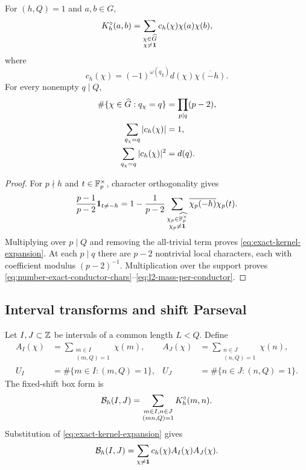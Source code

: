 \begin{proposition}\label{prop:exact-kernel-expansion}
For $(h,Q)=1$ and $a,b\in G$,
\begin{equation}\label{eq:exact-kernel-expansion}
 K_h^\circ(a,b)
 =\sum_{\substack{\chi\in\widehat G\\\chi\ne\mathbf 1}}
 c_h(\chi)\chi(a)\chi(b),
\end{equation}
where
\begin{equation}\label{eq:exact-kernel-coefficient}
 c_h(\chi)
 =(-1)^{\omega(q_\chi)}d(\chi)\overline{\chi(-h)}.
\end{equation}
For every nonempty $q\mid Q$,
\begin{align}
 \#\{\chi\in\widehat G:q_\chi=q\}
  &=\prod_{p\mid q}(p-2),\label{eq:number-exact-conductor-chars}\\
 \sum_{q_\chi=q}|c_h(\chi)|&=1,\label{eq:l1-mass-per-conductor}\\
 \sum_{q_\chi=q}|c_h(\chi)|^2&=d(q).\label{eq:l2-mass-per-conductor}
\end{align}
\end{proposition}

\begin{proof}
For $p\nmid h$ and $t\in\mathbb F_p^\times$, character orthogonality gives
\[
 \frac{p-1}{p-2}\mathbf 1_{t\ne-h}
 =1-\frac1{p-2}
 \sum_{\substack{\chi_p\in\widehat{\mathbb F_p^\times}\\\chi_p\ne\mathbf 1}}
 \overline{\chi_p(-h)}\chi_p(t).
\]
Multiplying over $p\mid Q$ and removing the all-trivial term proves \eqref{eq:exact-kernel-expansion}.  At each $p\mid q$ there are $p-2$ nontrivial local characters, each with coefficient modulus $(p-2)^{-1}$.  Multiplication over the support proves \eqref{eq:number-exact-conductor-chars}--\eqref{eq:l2-mass-per-conductor}.
\end{proof}

\subsection{Interval transforms and shift Parseval}

Let $I,J\subset\mathbb Z$ be intervals of a common length $L<Q$.  Define
\begin{align}
 A_I(\chi)
  &=\sum_{\substack{m\in I\\(m,Q)=1}}\chi(m),
 &
 A_J(\chi)
  &=\sum_{\substack{n\in J\\(n,Q)=1}}\chi(n),\label{eq:rough-character-transforms}\\
 U_I&=\#\{m\in I:(m,Q)=1\},
 &
 U_J&=\#\{n\in J:(n,Q)=1\}.
\end{align}
The fixed-shift box form is
\begin{equation}\label{eq:fixed-local-box-form}
 \mathcal B_h(I,J)
 =\sum_{\substack{m\in I,n\in J\\(mn,Q)=1}}
 K_h^\circ(m,n).
\end{equation}
Substitution of \eqref{eq:exact-kernel-expansion} gives
\begin{equation}\label{eq:fixed-box-character-expansion}
 \mathcal B_h(I,J)
 =\sum_{\chi\ne\mathbf 1}c_h(\chi)A_I(\chi)A_J(\chi).
\end{equation}

